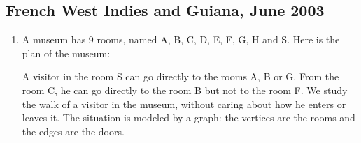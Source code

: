 \subsection{French West Indies and Guiana, June 2003}\label{ag03}
\begin{enumerate}
\item A museum has 9 rooms, named A, B, C, D, E, F, G, H and S. Here is the
      plan of the museum:

\medskip
\begin{center}
\end{center}

\medskip
A visitor in the room S can go directly to the rooms A, B or G. From the
room C, he can go directly to the room B but not to the room F. We study
the walk of a visitor in the museum, without caring about how he enters or
leaves it. The situation is modeled by a graph: the vertices are the rooms
and the edges are the doors.


\end{enumerate}
